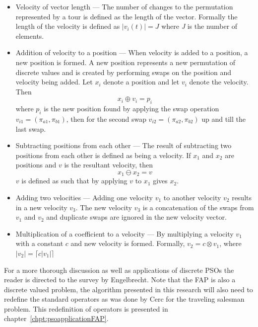 \begin{itemize}
    \item{Velocity of vector length} --- The number of changes to the permutation represented by a tour is defined as the length of the vector\cite{FundamentalSwarm}. Formally the length of the velocity is defined as $|v_i(t)|=J$ where \emph{J} is the number of elements.
\item{Addition of velocity to a position} --- When velocity is added to a position, a new position is formed\cite{FundamentalSwarm}. A new position represents a new permutation of discrete values and is created by performing swaps on the position and velocity being added\cite{FundamentalSwarm}. Let $x_i$ denote a position and let $v_i$ denote the velocity\cite{FundamentalSwarm}. Then
\begin{equation}
    x_i \oplus v_i = p_i
\end{equation}
where $p_i$ is the new position found by applying the swap operation $v_{i1} = (\pi_{a1},\pi_{b1})$, then for the second swap $v_{i2} = (\pi_{a2},\pi_{b2})$ up and till the last swap\cite{FundamentalSwarm}.
\item{Subtracting positions from each other}  --- The result of subtracting two positions from each other is defined as being a velocity\cite{FundamentalSwarm}. If $x_1$ and $x_2$ are positions and $v$ is the resultant velocity, then
\begin{equation}
x_1 \ominus x_2 = v
\end{equation}
$v$ is defined as such that by applying $v$ to $x_1$ gives $x_2$\cite{FundamentalSwarm}.
\item{Adding two velocities} --- Adding one velocity $v_1$ to another velocity $v_2$ results in a new velocity $v_3$\cite{FundamentalSwarm}. The new velocity $v_3$ is a concatenation of the swaps from $v_1$ and $v_2$ and duplicate swaps are ignored in the new velocity vector\cite{FundamentalSwarm}.
\item{Multiplication of a coefficient to a velocity} --- By multiplying a velocity $v_1$ with a constant $c$ and new velocity is formed. Formally, $v_2 = c \otimes v_1$, where $|v_2| = \lceil c|v_1|\rceil$\cite{FundamentalSwarm}
\end{itemize}

For a more thorough discussion as well as applications of discrete \glspl{PSO} the reader is directed to the survey by Engelbrecht\cite{FundamentalSwarm}. Note that the \gls{FAP} is also a discrete valued problem, the algorithm presented in this research will also need to redefine the standard operators as was done by Cerc for the traveling salesman problem. This redefinition of operators is presented in chapter~\ref{chpt:psoapplicationFAP}.
